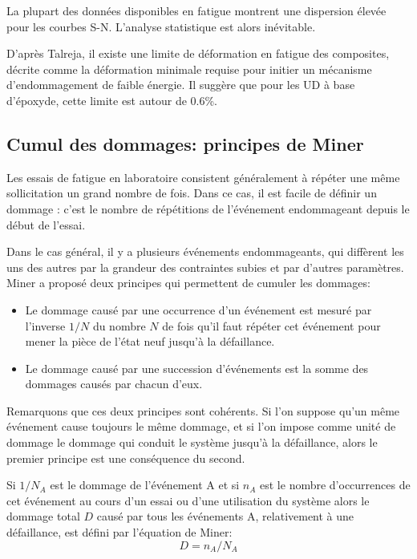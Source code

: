 \medskip
La plupart des données disponibles en fatigue montrent une dispersion
élevée pour les courbes S-N. L'analyse statistique est alors inévitable.

\medskip
D'après Talreja, il existe une limite de déformation en fatigue
des composites, décrite comme la déformation minimale requise pour
initier un mécanisme d'endommagement de faible énergie.
Il suggère que pour les UD à base d'époxyde, cette limite est
autour de 0.6\%.


\medskip
\subsection{Cumul des dommages: principes de Miner}

\medskip
Les essais de fatigue en laboratoire consistent généralement à répéter une même
sollicitation un grand nombre de fois. Dans ce cas, il est facile de définir un dommage : c'est
le nombre de répétitions de l'événement endommageant depuis le début de l'essai.

Dans le cas général, il y a plusieurs événements endommageants, qui diffèrent les uns
des autres par la grandeur des contraintes subies et par d'autres paramètres. Miner a proposé
deux principes qui permettent de cumuler les dommages:
\begin{itemize}
    \item Le dommage causé par une occurrence d'un événement est mesuré par l'inverse
	$1/N$ du nombre $N$ de fois qu'il faut répéter cet événement pour mener la pièce de
	l'état neuf jusqu'à la défaillance.
    \item Le dommage causé par une succession d'événements est la somme des dommages
	causés par chacun d'eux.
\end{itemize}

\medskip
Remarquons que ces deux principes sont cohérents. Si l'on suppose qu'un même événement
cause toujours le même dommage, et si l'on impose comme unité de dommage le dommage qui
conduit le système jusqu'à la défaillance, alors le premier principe est une conséquence du second.

Si $1 / N_A$ est le dommage de l'événement A et si $n_A$ est le nombre d'occurrences de cet
événement au cours d'un essai ou d'une utilisation du système alors le dommage total $D$
causé par tous les événements A, relativement à une défaillance, est défini par l'équation
de Miner:
\begin{equation}  D = n_A / N_A  \end{equation}

